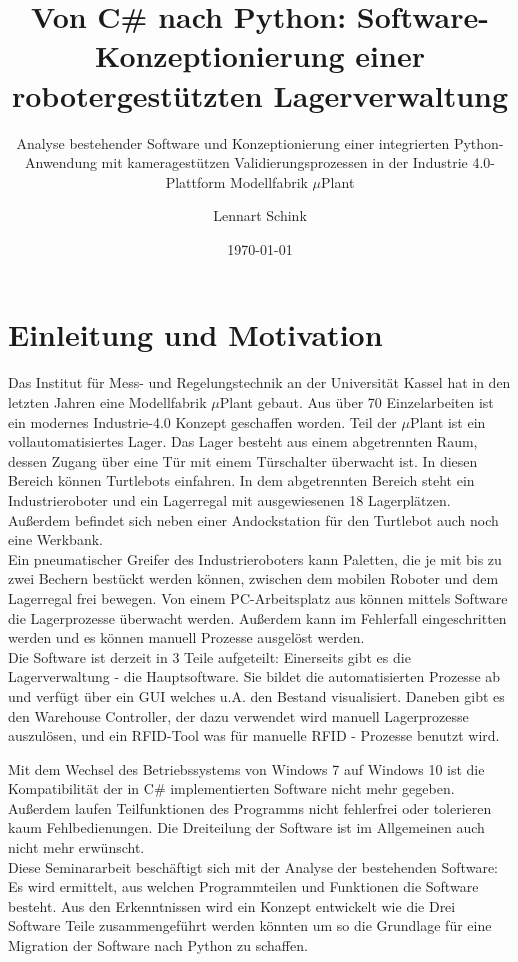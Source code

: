 \documentclass[11pt]{scrartcl}
\title{Von C\# nach Python: Software-Konzeptionierung einer robotergestützten Lagerverwaltung}
\subtitle{Analyse bestehender Software und Konzeptionierung einer integrierten Python-Anwendung mit kameragestützen Validierungsprozessen in der Industrie 4.0-Plattform Modellfabrik $\mu$Plant}
\author{Lennart Schink}
\date{\today}
\begin{document}
    \maketitle
    \tableofcontents
    \newpage

    \section{Einleitung und Motivation}
    Das Institut für Mess- und Regelungstechnik an der Universität Kassel hat in den letzten Jahren eine Modellfabrik $\mu$Plant gebaut.
    Aus über 70 Einzelarbeiten ist ein modernes Industrie-4.0 Konzept geschaffen worden. Teil der $\mu$Plant ist ein vollautomatisiertes Lager.
    Das Lager besteht aus einem abgetrennten Raum, dessen Zugang über eine Tür mit einem Türschalter überwacht ist. In diesen Bereich können Turtlebots einfahren.
    In dem abgetrennten Bereich steht ein Industrieroboter und ein Lagerregal mit ausgewiesenen 18 Lagerplätzen. Außerdem befindet sich neben einer Andockstation für den Turtlebot auch noch eine Werkbank. \\

    Ein pneumatischer Greifer des Industrieroboters kann Paletten, die je mit bis zu zwei Bechern bestückt werden können, zwischen dem mobilen Roboter und dem Lagerregal frei bewegen.
    Von einem PC-Arbeitsplatz aus können mittels Software die Lagerprozesse überwacht werden. Außerdem kann im Fehlerfall eingeschritten werden und es können manuell Prozesse ausgelöst werden.\\

    Die Software ist derzeit in 3 Teile aufgeteilt: Einerseits gibt es die Lagerverwaltung - die Hauptsoftware. Sie bildet die automatisierten Prozesse ab und verfügt über ein GUI welches u.A. den Bestand visualisiert.
    Daneben gibt es den Warehouse Controller, der dazu verwendet wird manuell Lagerprozesse auszulösen, und ein RFID-Tool was für manuelle RFID - Prozesse benutzt wird.

    Mit dem Wechsel des Betriebssystems von Windows 7 auf Windows 10 ist die Kompatibilität der in C\# implementierten Software nicht mehr gegeben. Außerdem laufen Teilfunktionen des Programms nicht fehlerfrei oder tolerieren kaum Fehlbedienungen.
    Die Dreiteilung der Software ist im Allgemeinen auch nicht mehr erwünscht. \\

    Diese Seminararbeit beschäftigt sich mit der Analyse der bestehenden Software: Es wird ermittelt, aus welchen Programmteilen und Funktionen die Software besteht.
    Aus den Erkenntnissen wird ein Konzept entwickelt wie die Drei Software Teile zusammengeführt werden könnten um so die Grundlage für eine Migration der Software nach Python zu schaffen.
\end{document}
